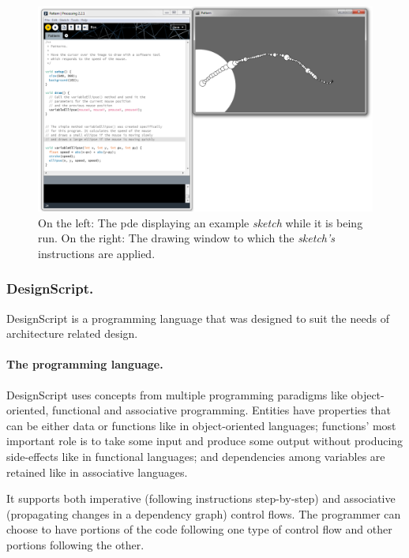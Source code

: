 \documentclass{./llncs2e/llncs}
\begin{document}
	\begin{figure}
		\centering
		\includegraphics[width=1.0\textwidth]{img/proc_dev_env}
		\caption{On the left: The \ac{pde} displaying an example \emph{sketch} while it is being run. On the right: The drawing window to which the \emph{sketch's} instructions are applied.}
		\label{fig:proc:dev:env}
	\end{figure} 
	

\subsubsection{DesignScript.}
	DesignScript\cite{aish2012designscript} is a programming language that was designed to suit the needs of architecture related design.
	
	\paragraph{The programming language.}
	DesignScript uses concepts from multiple programming paradigms like object-oriented, functional and associative programming. 
	Entities have properties that can be either data or functions like in object-oriented languages; functions' most important role is to take some input and produce some output without producing side-effects like in functional languages; and dependencies among variables are retained like in associative languages.
	
	It supports both imperative (following instructions step-by-step) and associative (propagating changes in a dependency graph) control flows. 
	The programmer can choose to have portions of the code following one type of control flow and other portions following the other.
	
\end{document}
